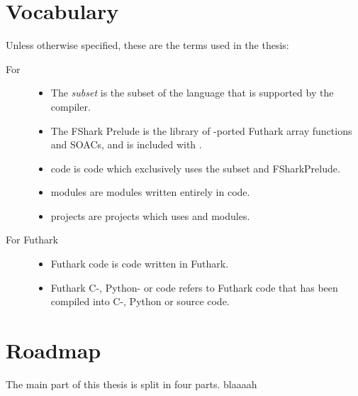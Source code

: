 \section*{Vocabulary}
Unless otherwise specified, these are the terms used in the thesis:
\begin{description}
\item[For \fshark{}]\hfill
  \begin{itemize}
  \item The \fshark{} \textit{subset} is the subset of the \fsharp{} language
    that is supported by the \fshark{} compiler.

  \item The FShark Prelude is the library of \fsharp{}-ported Futhark array
    functions and SOACs, and is included with \fshark{}.

  \item \fshark{} code is \fsharp{} code which exclusively uses the \fshark{}
    subset and FSharkPrelude.

  \item \fshark{} modules are \fsharp{} modules written entirely in \fshark{}
    code.
    
  \item \fshark{} projects are \fsharp{} projects which uses \fshark{} and
    \fshark{} modules.
    \\
  \end{itemize}

\item[For Futhark]\hfill
  \begin{itemize}

  \item Futhark code is code written in Futhark.

  \item Futhark C-, Python- or \csharp{} code refers to Futhark code that has been compiled
    into C-, Python or \csharp{} source code.

  \end{itemize}
\end{description}



\section*{Roadmap}
The main part of this thesis is split in four parts.
blaaaah


